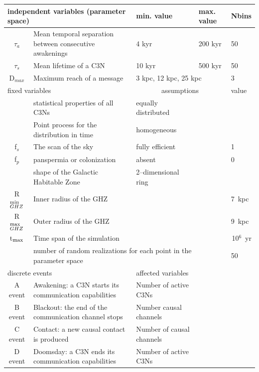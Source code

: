 \documentclass[crop]{CSLB}
\newcommand{\ceti}{C3N}
\newcommand{\cetis}{C3Ns}
\begin{document}
 \setlength{\tabcolsep}{10pt}
\begin{table}
\centering
\begin{tabular}{cllll}
\hline
   \multicolumn{2}{l}{independent variables (parameter space)}
   &min. value&max. value&Nbins\\
\hline

   $\tau_{a}$ & Mean temporal separation between consecutive
   awakenings & 4 kyr & 200 kyr & 50\\ 
   $\tau_{s}$ & Mean lifetime of a \ceti{}
   & 10 kyr & 500 kyr& 50\\ 
   D$_{max}$ & Maximum reach of a message  &  \multicolumn{2}{l}{3 kpc, 12 kpc, 25 kpc} & 3\\
\hline 

   \multicolumn{2}{l}{fixed variables} & \multicolumn{2}{c}{assumptions} &value \\
\hline
   & statistical properties of all \cetis{} &equally distributed&&\\
   & Point process for the distribution in time & homogeneous &&\\
   f$_s$ & The scan of the sky & fully efficient&&1\\
   f$_p$ & panspermia or colonization &absent&&0\\
   & shape of the Galactic Habitable Zone & 2--dimensional ring &&\\
	R$_{GHZ}^{\rm min}$   & Inner radius of the GHZ  & \citet{lineweaver_galactic_2004} & & 7~kpc\\
   R$_{GHZ}^{\rm max}$   & Outer radius of the GHZ       & \citet{lineweaver_galactic_2004} & & 9~kpc\\
	t$_{\rm max}$ & Time span of the simulation  & & \multicolumn{2}{r}{10$^6$~yr} \\
    & \multicolumn{3}{l}{number of random realizations for each point
    in the parameter space} & 50 \\
\hline
   \multicolumn{2}{l}{discrete events} &
   \multicolumn{3}{l}{affected variables}\\
\hline
   A event & Awakening: a \ceti{} starts its communication
   capabilities &Number of active \cetis{}\\
   B event & Blackout: the end of the communication channel stops
   &Number causal channels\\
   C event & Contact: a new causal contact is produced &Number of causal channels\\
   D event & Doomsday: a \ceti{} ends its communication capabilities&Number of active \cetis{}\\
\hline


\end{tabular}
\end{table}
\end{document}
